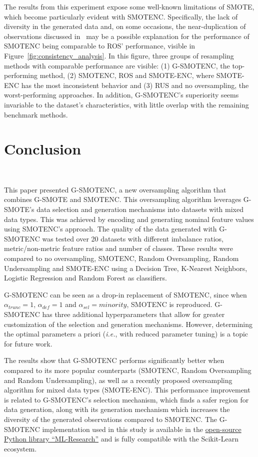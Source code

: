 The results from this experiment expose some well-known limitations of SMOTE,
which become particularly evident with SMOTENC. Specifically, the lack of
diversity in the generated data and, on some occasions, the near-duplication
of observations discussed in~\cite{Douzas2019} may be a possible
explanation for the performance of SMOTENC being comparable to ROS'
performance, visible in Figure~\ref{fig:consistency_analysis}. In this
figure, three groups of resampling methods with comparable performance are
visible: (1) G-SMOTENC, the top-performing method, (2) SMOTENC, ROS and
SMOTE-ENC, where SMOTE-ENC has the most inconsistent behavior and (3) RUS and
no oversampling, the worst-performing approaches. In addition, G-SMOTENC's
superiority seems invariable to the dataset's characteristics, with little
overlap with the remaining benchmark methods.

\section{Conclusion}~\label{sec:conclusion-gsmotenc}

This paper presented G-SMOTENC, a new oversampling algorithm that combines
G-SMOTE and SMOTENC. This oversampling algorithm leverages G-SMOTE's data
selection and generation mechanisms into datasets with mixed data types. This
was achieved by encoding and generating nominal feature values using SMOTENC's
approach. The quality of the data generated with G-SMOTENC was tested over 20
datasets with different imbalance ratios, metric/non-metric feature ratios
and number of classes. These results were compared to no oversampling,
SMOTENC, Random Oversampling, Random Undersampling and SMOTE-ENC using a
Decision Tree, K-Nearest Neighbors, Logistic Regression and Random Forest as
classifiers.

G-SMOTENC can be seen as a drop-in replacement of SMOTENC, since when
$\alpha_{trunc}=1$, $\alpha_{def}=1$ and $\alpha_{sel}=minority$, SMOTENC is
reproduced. G-SMOTENC has three additional hyperparameters that allow for
greater customization of the selection and generation mechanisms.  However,
determining the optimal parameters a priori (\textit{i.e.}, with reduced
parameter tuning) is a topic for future work.

The results show that G-SMOTENC performs significantly better when compared to
its more popular counterparts (SMOTENC, Random Oversampling and Random
Undersampling), as well as a recently proposed oversampling algorithm for
mixed data types (SMOTE-ENC). This performance improvement is related to
G-SMOTENC's selection mechanism, which finds a safer region for data
generation, along with its generation mechanism which increases the diversity
of the generated observations compared to SMOTENC. The G-SMOTENC
implementation used in this study is available in the
\href{https://github.com/joaopfonseca/ml-research}{open-source Python library
``ML-Research''} and is fully compatible with the Scikit-Learn ecosystem.
